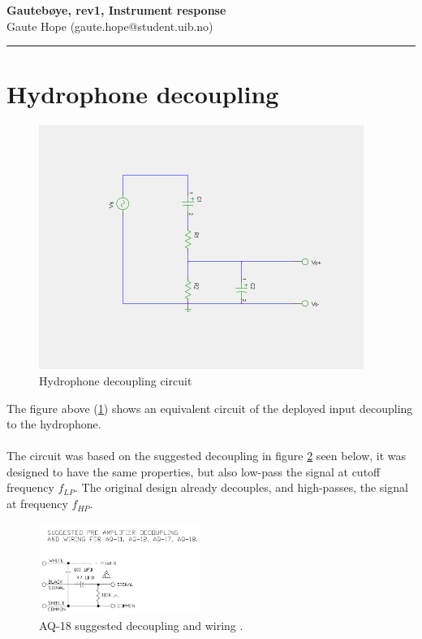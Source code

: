 \documentclass[a4paper]{article}
\newcommand{\makeheading}[2]%
        {\hspace*{-\marginparsep minus \marginparwidth}%
         \begin{minipage}[t]{\textwidth\marginparwidth\marginparsep}%
           {\large \bfseries #1}\\{#2}\\[-0.15\baselineskip]%
                 \rule{\columnwidth}{1pt}%
         \end{minipage}}
\begin{document}
\makeheading{Gautebøye, rev1, Instrument response}{Gaute Hope
(gaute.hope@student.uib.no)}

\section{Hydrophone decoupling}
\begin{figure}[h]
  \begin{center}
  \includegraphics[width=400px]{Hydrophone_decoupling.png}
\end{center}
  \caption{Hydrophone decoupling circuit}
  \label{fig:hydrophone_decoupling}
\end{figure}

The figure above (\ref{fig:hydrophone_decoupling}) shows an equivalent
circuit of the deployed input decoupling to the hydrophone.

\paragraph{}The circuit was based on the suggested decoupling in figure
\ref{fig:suggested_decoupling} seen below, it was designed to have the
same properties, but also low-pass the signal at cutoff frequency
$f_{LP}$. The original design already decouples, and high-passes, the
signal at frequency $f_{HP}$.

\begin{figure}[h!]
  \begin{center}
    \includegraphics[width=200px]{AQ-18-decoupling-and-wiring.jpg}
  \end{center}
  \caption{AQ-18 suggested decoupling and wiring
    \cite{aq-18_decoupling}.}
  \label{fig:suggested_decoupling}
\end{figure}
\end{document}

